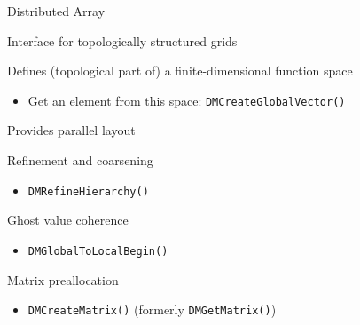\begin{frame}[fragile]{Distributed Array}

  \begin{block}{Interface for topologically structured grids}
  \end{block}

  \begin{block}{Defines (topological part of) a finite-dimensional function space}
    \begin{itemize} 
      \item Get an element from this space: \lstinline|DMCreateGlobalVector()| 
    \end{itemize}
  \end{block}

  \begin{block}{Provides parallel layout}
  \end{block}

  \begin{block}{Refinement and coarsening}
    \begin{itemize}
      \item \lstinline|DMRefineHierarchy()| 
    \end{itemize}
  \end{block}

  \begin{block}{Ghost value coherence}
    \begin{itemize}
       \item \lstinline|DMGlobalToLocalBegin()|
     \end{itemize}
  \end{block}

  \begin{block}{Matrix preallocation}
       \begin{itemize}
         \item \lstinline|DMCreateMatrix()| (formerly \lstinline|DMGetMatrix()|) 
       \end{itemize}
  \end{block}
\end{frame}




















